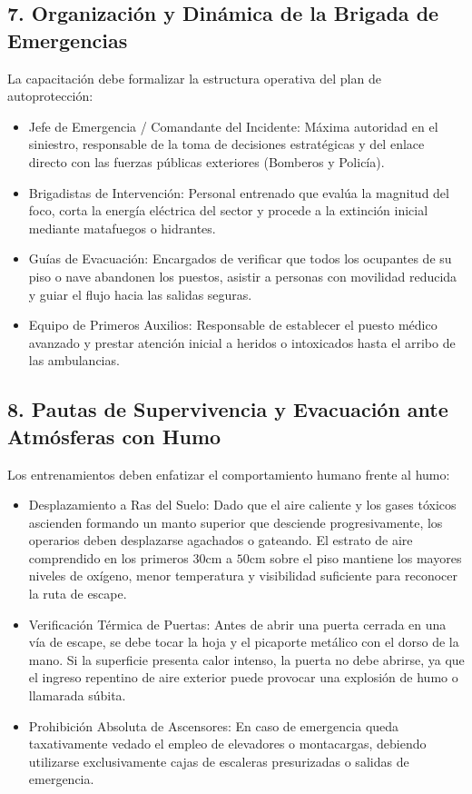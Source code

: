\subsection{7. Organización y Dinámica de la Brigada de Emergencias}
La capacitación debe formalizar la estructura operativa del plan de autoprotección:
\begin{itemize}
    \item Jefe de Emergencia / Comandante del Incidente: Máxima autoridad en el siniestro, responsable de la toma de
          decisiones estratégicas y del enlace directo con las fuerzas públicas exteriores (Bomberos y Policía).
    \item Brigadistas de Intervención: Personal entrenado que evalúa la magnitud del foco, corta la energía eléctrica del
          sector y procede a la extinción inicial mediante matafuegos o hidrantes.
    \item Guías de Evacuación: Encargados de verificar que todos los ocupantes de su piso o nave abandonen los puestos,
          asistir a personas con movilidad reducida y guiar el flujo hacia las salidas seguras.
    \item Equipo de Primeros Auxilios: Responsable de establecer el puesto médico avanzado y prestar atención inicial a
          heridos o intoxicados hasta el arribo de las ambulancias.
\end{itemize}

\subsection{8. Pautas de Supervivencia y Evacuación ante Atmósferas con Humo}
Los entrenamientos deben enfatizar el comportamiento humano frente al humo:
\begin{itemize}
    \item Desplazamiento a Ras del Suelo: Dado que el aire caliente y los gases tóxicos ascienden formando un manto
          superior que desciende progresivamente, los operarios deben desplazarse agachados o gateando. El estrato de aire
          comprendido en los primeros $30\unit{\centi\meter}$ a $50\unit{\centi\meter}$ sobre el piso mantiene los mayores
          niveles de oxígeno, menor temperatura y visibilidad suficiente para reconocer la ruta de escape.
    \item Verificación Térmica de Puertas: Antes de abrir una puerta cerrada en una vía de escape, se debe tocar la hoja y
          el picaporte metálico con el dorso de la mano. Si la superficie presenta calor intenso, la puerta no debe abrirse,
          ya que el ingreso repentino de aire exterior puede provocar una explosión de humo o llamarada súbita.
    \item Prohibición Absoluta de Ascensores: En caso de emergencia queda taxativamente vedado el empleo de elevadores o
          montacargas, debiendo utilizarse exclusivamente cajas de escaleras presurizadas o salidas de emergencia.
\end{itemize}

